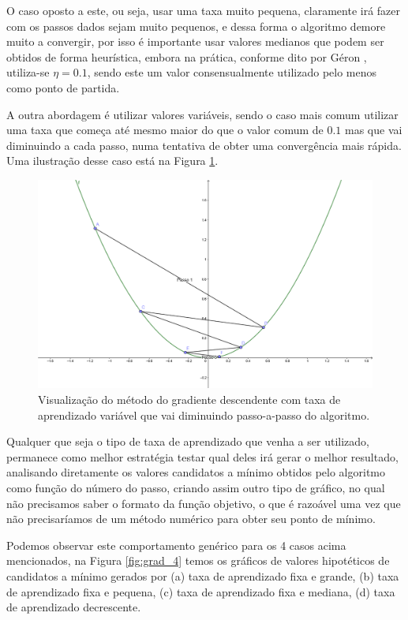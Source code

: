 O caso oposto a este, ou seja, usar uma taxa muito pequena, claramente irá fazer com os passos dados sejam muito pequenos, e dessa forma o algoritmo demore muito a convergir, por isso é importante usar valores medianos que podem ser obtidos de forma heurística, embora na prática, conforme dito por Géron \citep{hands}, utiliza-se $\eta = 0.1$, sendo este um valor consensualmente utilizado pelo menos como ponto de partida.

A outra abordagem é utilizar valores variáveis, sendo o caso mais comum utilizar uma taxa que começa até mesmo maior do que o valor comum de $0.1$ mas que vai diminuindo a cada passo, numa tentativa de obter uma convergência mais rápida. Uma ilustração desse caso está na Figura \ref{fig:grad_3}.

\begin{figure}[htb]
\centering
\includegraphics[height=7cm]{figuras/grad_3}
\caption{Visualização do método do gradiente descendente com taxa de aprendizado variável que vai diminuindo passo-a-passo do algoritmo.}
\label{fig:grad_3}
\end{figure}

Qualquer que seja o tipo de taxa de aprendizado que venha a ser utilizado, permanece como melhor estratégia testar qual deles irá gerar o melhor resultado, analisando diretamente os valores candidatos a mínimo obtidos pelo algoritmo como função do número do passo, criando assim outro tipo de gráfico, no qual não precisamos saber o formato da função objetivo, o que é razoável uma vez que não precisaríamos de um método numérico para obter seu ponto de mínimo.

Podemos observar este comportamento genérico para os 4 casos acima mencionados, na Figura \ref{fig:grad_4} temos os gráficos de valores hipotéticos de candidatos a mínimo gerados por (a) taxa de aprendizado fixa e grande, (b) taxa de aprendizado fixa e pequena, (c) taxa de aprendizado fixa e mediana, (d) taxa de aprendizado decrescente.

